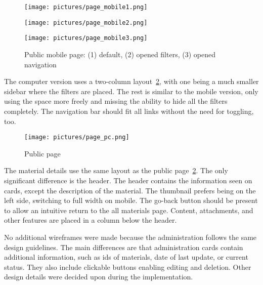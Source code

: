 \documentclass[
  digital,     %
  oneside,     %
  nosansbold,  %
  colorbold, %
  lof,         %
  lot,         %
]{fithesis4}
\begin{document}
\begin{figure}[!htbp]
	\begin{center}
		\begin{minipage}{.3\textwidth}
			\texttt{[image: pictures/page\_mobile1.png]}
		\end{minipage}
		\hfill
		\begin{minipage}{.3\textwidth}
			\texttt{[image: pictures/page\_mobile2.png]}
		\end{minipage}
		\hfill
		\begin{minipage}{.3\textwidth}
			\texttt{[image: pictures/page\_mobile3.png]}
		\end{minipage}
	\end{center}
	\caption{Public mobile page: (1) default, (2) opened filters, (3) opened navigation}
	\label{fig:page-mobile}
\end{figure}

The computer version uses a two-column layout~\ref{fig:page-pc}, with one being a much smaller sidebar where the filters are placed. The rest is similar to the mobile version, only using the space more freely and missing the ability to hide all the filters completely. The navigation bar should fit all links without the need for toggling, too.

\begin{figure}
	\begin{center}
		\begin{minipage}{.9\textwidth}
			\texttt{[image: pictures/page\_pc.png]}
		\end{minipage}
	\end{center}
	\caption{Public page}
	\label{fig:page-pc}
\end{figure}

The material details use the same layout as the public page~\ref{fig:page-pc}. The only significant difference is the header. The header contains the information seen on cards, except the description of the material. The thumbnail prefers being on the left side, switching to full width on mobile. The go-back button should be present to allow an intuitive return to the all materials page. Content, attachments, and other features are placed in a column below the header.

No additional wireframes were made because the administration follows the same design guidelines. The main differences are that administration cards contain additional information, such as ids of materials, date of last update, or current status. They also include clickable buttons enabling editing and deletion. Other design details were decided upon during the implementation.
\end{document}
